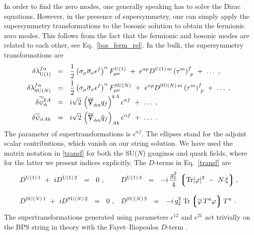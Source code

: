 \documentclass[12pt]{article}
\def\Tr{{\rm Tr}}
\newcommand{\wt}{\widetilde}
\newcommand{\ov}{\overline}
\newcommand{\lgr}{\left\lgroup}
\newcommand{\rgr}{\right\rgroup}
\def\slashed#1{\setbox0=\hbox{$#1$}             %
   \dimen0=\wd0                                 %
   \setbox1=\hbox{/} \dimen1=\wd1               %
   \ifdim\dimen0>\dimen1                        %
      \rlap{\hbox to \dimen0{\hfil/\hfil}}      %
      #1                                        %
   \else                                        %
      \rlap{\hbox to \dimen1{\hfil$#1$\hfil}}   %
      /                                         %
   \fi}                                        %
\begin{document}
	In order to find the zero modes, one generally speaking has to solve the Dirac equations.
	However, in the presence of supersymmetry,  one can simply apply the supersymmetry transformations
	to the bosonic solution to obtain the fermionic zero modes.
	This follows from the fact that the fermionic and bosonic modes are related to each other, 
	see Eq.~\eqref{bos_ferm_rel}.
	In the bulk, the supersymmetry transformations are
\begin{align}
%
\notag
	\delta\lambda^{f\alpha}_{\rm U(1)} & ~~=~~ \frac{1}{2} \left(\sigma_\mu \ov{\sigma}{}_\nu \epsilon^f \right)^\alpha 
							        F_{\mu\nu}^{\rm U(1)}  
						~+~ \epsilon^{\alpha p} D^{{\rm U(1)}\,m} \left( \tau^m \right)^f_{\ p}
						~+~ \dots~,
\\
%
\notag
	\delta\lambda^{f\alpha}_\text{SU($N$)} & ~~=~~ \frac{1}{2} \left(\sigma_\mu \ov{\sigma}{}_\nu \epsilon^f \right)^\alpha
								F_{\mu\nu}^\text{SU($N$)}
						~+~ \epsilon^{\alpha p} D^{\text{SU($N$)}\,m} \left( \tau^m \right)^f_{\ p}
						~+~ \dots~,
\\[-0.7cm]
%
\label{transf}
\\
%
\notag
	\delta\ov{\wt{\psi}}{}_{\dot{\alpha}}^{kA} & ~~=~~ i\sqrt{2}\, 
				\left( \ov{\slashed{\nabla}}_{\dot{\alpha}\alpha} q_f \right)^{kA} \epsilon^{\alpha f} 
						~+~ \dots~,
\\
%
\notag
	\delta\ov{\psi}{}_{\dot{\alpha} A k} & ~~=~~ i\sqrt{2}\, 
				\left( \ov{\slashed{\nabla}}_{\dot{\alpha}\alpha} \ov{q}{}_f \right)_{Ak} \epsilon^{\alpha f}
						~+~ \dots ~.
\end{align}
	The parameter of supertransformations is $ \epsilon^{\alpha f} $. 
	The ellipses stand for the adjoint scalar contributions, which vanish on our string solution. 
	We have used the matrix notation in \eqref{transf} for both the SU($N$) gauginos and quark fields, where for the latter
	we present indices explicitly.
	The $ D $-terms in Eq.~\eqref{transf} are
\begin{align}
%
\notag
	& D^{{\rm U(1)}\,1}  ~+~  i D^{{\rm U(1)}\,2} ~~=~~ 0~,      
	&& D^{{\rm U(1)}\,3} ~~=~~ -i\, \frac{g_1^2}{4}\, \lgr \Tr |\varphi|^2 ~-~ N\,\xi \rgr,
	\\[3mm]
%
\label{dterm}
	& D^{\text{SU($N$)}\,1}  ~+~  i D^{\text{SU($N$)}\,2} ~~=~~ 0~,    
	&& D^{\text{SU($N$)}\,3} ~~=~~ -i\, g_2^2\; \Tr \lgr \ov{\varphi}\, T^a \varphi \rgr T^a~.
\end{align}
	The supertransformations generated using parameters $ \epsilon^{12} $ and $ \epsilon^{21} $ act trivially on the
	BPS string in theory with the Fayet--Iliopoulos $ D $-term \cite{VY, SYhet}.
\end{document}

